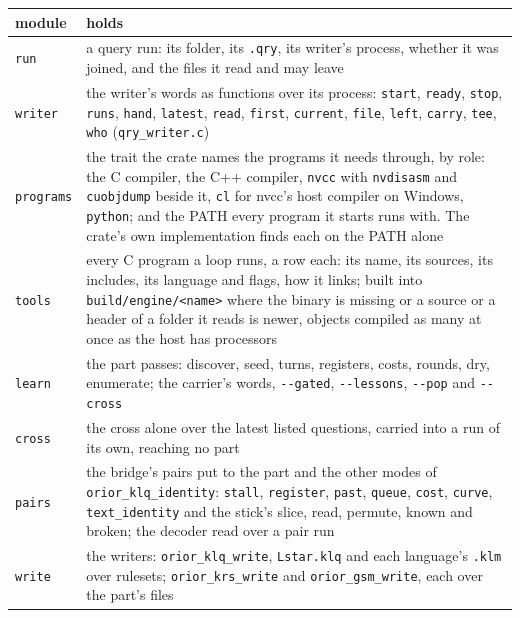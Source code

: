 {\small
\setlength{\tabcolsep}{6pt}
\begin{longtable}{>{\RaggedRight\arraybackslash}p{}>{\RaggedRight\arraybackslash}p{}}
\toprule
module & holds \\
\midrule
\endhead
\texttt{run} & a query run: its folder, its \texttt{.\allowbreak{}qry}, its writer's process, whether it was joined, and the files it read and may leave \\
\texttt{writer} & the writer's words as functions over its process: \texttt{start}, \texttt{ready}, \texttt{stop}, \texttt{runs}, \texttt{hand}, \texttt{latest}, \texttt{read}, \texttt{first}, \texttt{current}, \texttt{file}, \texttt{left}, \texttt{carry}, \texttt{tee}, \texttt{who} (\texttt{qry\_\allowbreak{}writer.\allowbreak{}c}) \\
\texttt{programs} & the trait the crate names the programs it needs through, by role: the C compiler, the C++ compiler, \texttt{nvcc} with \texttt{nvdisasm} and \texttt{cuobjdump} beside it, \texttt{cl} for nvcc's host compiler on Windows, \texttt{python}; and the PATH every program it starts runs with. The crate's own implementation finds each on the PATH alone \\
\texttt{tools} & every C program a loop runs, a row each: its name, its sources, its includes, its language and flags, how it links; built into \texttt{build/\allowbreak{}engine/\allowbreak{}<name>} where the binary is missing or a source or a header of a folder it reads is newer, objects compiled as many at once as the host has processors \\
\texttt{learn} & the part passes: discover, seed, turns, registers, costs, rounds, dry, enumerate; the carrier's words, \texttt{-\allowbreak{}-\allowbreak{}gated}, \texttt{-\allowbreak{}-\allowbreak{}lessons}, \texttt{-\allowbreak{}-\allowbreak{}pop} and \texttt{-\allowbreak{}-\allowbreak{}cross} \\
\texttt{cross} & the cross alone over the latest listed questions, carried into a run of its own, reaching no part \\
\texttt{pairs} & the bridge's pairs put to the part and the other modes of \texttt{orior\_\allowbreak{}klq\_\allowbreak{}identity}: \texttt{stall}, \texttt{register}, \texttt{past}, \texttt{queue}, \texttt{cost}, \texttt{curve}, \texttt{text\_\allowbreak{}identity} and the stick's slice, read, permute, known and broken; the decoder read over a pair run \\
\texttt{write} & the writers: \texttt{orior\_\allowbreak{}klq\_\allowbreak{}write}, \texttt{Lstar.\allowbreak{}klq} and each language's \texttt{.\allowbreak{}klm} over rulesets; \texttt{orior\_\allowbreak{}krs\_\allowbreak{}write} and \texttt{orior\_\allowbreak{}gsm\_\allowbreak{}write}, each over the part's files \\

\end{longtable}}
